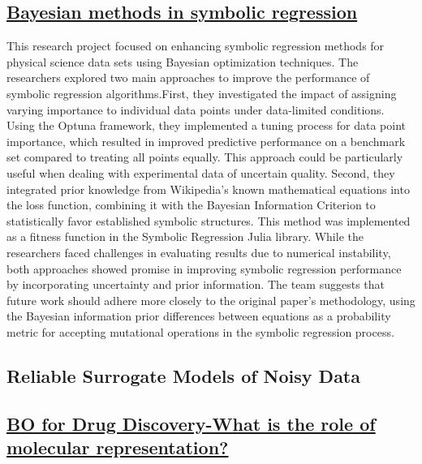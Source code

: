  \subsection*{\href{https://www.youtube.com/watch?v=KKxlqo15wVY}{Bayesian methods in symbolic regression}}

This research project focused on enhancing symbolic regression methods for physical science data sets using Bayesian optimization techniques. The researchers explored two main approaches to improve the performance of symbolic regression algorithms.First, they investigated the impact of assigning varying importance to individual data points under data-limited conditions. Using the Optuna framework, they implemented a tuning process for data point importance, which resulted in improved predictive performance on a benchmark set compared to treating all points equally. This approach could be particularly useful when dealing with experimental data of uncertain quality. Second, they integrated prior knowledge from Wikipedia's known mathematical equations into the loss function, combining it with the Bayesian Information Criterion to statistically favor established symbolic structures. This method was implemented as a fitness function in the Symbolic Regression Julia library. While the researchers faced challenges in evaluating results due to numerical instability, both approaches showed promise in improving symbolic regression performance by incorporating uncertainty and prior information. The team suggests that future work should adhere more closely to the original paper's methodology, using the Bayesian information prior differences between equations as a probability metric for accepting mutational operations in the symbolic regression process.
 \subsection*{Reliable Surrogate Models of Noisy Data}


 \subsection*{\href{https://www.youtube.com/watch?v=5f_UwsfYrc8}{BO for Drug Discovery-What is the role of molecular representation?}}

